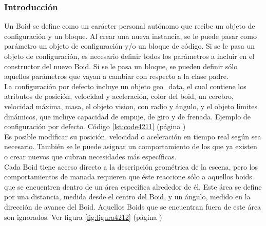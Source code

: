 \subsubsection{Introducción}
\label{subsubsection:boid_general}

Un Boid se define como un carácter personal autónomo que recibe un objeto de configuración y un bloque. Al crear una nueva instancia, se 
le puede pasar como parámetro un objeto de configuración y/o un bloque de código. Si se le pasa un objeto de configuración, es necesario 
definir todos los parámetros a incluir en el constructor del nuevo Boid. Si se le pasa un bloque, se pueden definir sólo aquellos parámetros 
que vayan a cambiar con respecto a la clase padre.\\

La configuración por defecto incluye un objeto geo\_data, el cual contiene los atributos de posición, velocidad y aceleración, color del 
boid, un cerebro, velocidad máxima, masa, el objeto vision, con radio y ángulo, y el objeto límites dinámicos, que incluye capacidad de 
empuje, de giro y de frenada. Ejemplo de configuración por defecto. Código \ref{lst:code4211} (página \pageref{lst:code4211})\\

Es posible modificar su posición, velocidad o aceleración en tiempo real según sea necesario. También se le puede asignar un comportamiento 
de los que ya existen o crear nuevos que cubran necesidades más específicas.\\

Cada Boid tiene acceso directo a la descripción geométrica de la escena, pero los comportamientos de manada requieren que éste reaccione 
sólo a aquellos boids que se encuentren dentro de un área específica alrededor de él. Este área se define por una distancia, medida desde 
el centro del Boid, y un ángulo, medido en la dirección de avance del Boid. Aquellos Boids que se encuentran fuera de este área son ignorados. 
Ver figura \ref{fig:figura4212} (página \pageref{fig:figura4212})\\


